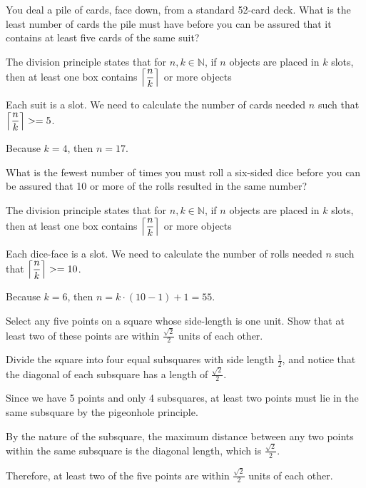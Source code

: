 \documentclass[openany, 11pt]{book}
\begin{document}
\begin{exercise}{}{}
	You deal a pile of cards, face down, from a standard
	52-card deck. What is the least number of cards the pile must have before
	you can be assured that it contains at least five cards of the same suit?
	\begin{alist}
		\item The division principle states that for $n, k\in \mathbb{N}$, if $n$
		objects are placed in $k$ slots, then at least one box contains
		$\left\lceil\dfrac{n}{k}\right\rceil$ or more objects
		\item Each suit is a slot. We need to calculate the number of cards needed
		$n$ such that $\left\lceil\dfrac{n}{k}\right\rceil>=5$.
		\item Because $k=4$, then $n=17$.
	\end{alist}
\end{exercise}

\begin{exercise}{}{}
	What is the fewest number of times you must roll a
	six-sided dice before you can be assured that 10 or more of the rolls
	resulted in the same number?
	\begin{alist}
		\item The division principle states that for $n, k\in \mathbb{N}$, if $n$
		objects are placed in $k$ slots, then at least one box contains
		$\left\lceil\dfrac{n}{k}\right\rceil$ or more objects
		\item Each dice-face is a slot. We need to calculate the number of rolls needed
		$n$ such that $\left\lceil\dfrac{n}{k}\right\rceil>=10$.
		\item Because $k=6$, then $n=k\cdot(10 -1)+ 1 = 55$.
	\end{alist}
\end{exercise}

\begin{exercise}{}{}
	Select any five points on a square whose side-length is one
	unit. Show that at least two of these points are within $\frac{\sqrt{2}}{2}$
	units of each other.

	\begin{alist}
		\item Divide the square into four equal subsquares with side length
		$\frac{1}{2}$, and notice that the diagonal of each subsquare has a length
		of $\frac{\sqrt{2}}{2}$.
		\item Since we have 5 points and only 4 subsquares, at least two points must lie
		in the same subsquare by the pigeonhole principle.
		\item By the nature of the subsquare, the maximum distance between any two
		points within the same subsquare is the diagonal length, which is
		$\frac{\sqrt{2}}{2}$.
		\item Therefore, at least two of the five points are within $\frac{\sqrt{2}}{2}$
		units of each other.
	\end{alist}
\end{exercise}
\end{document}
